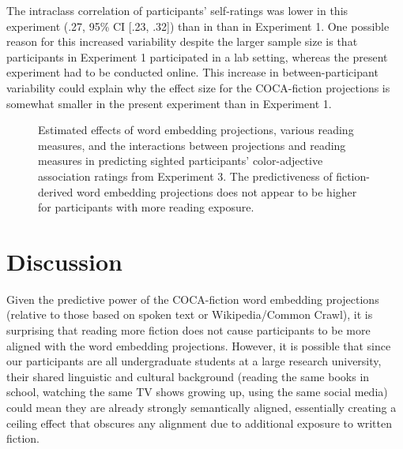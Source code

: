 \documentclass[10pt,letterpaper]{article}
\begin{document}
The intraclass correlation of participants' self-ratings was lower in this experiment (.27, 95\% CI [.23, .32]) than in than in Experiment 1. One possible reason for this increased variability despite the larger sample size is that participants in Experiment 1 participated in a lab setting, whereas the present experiment had to be conducted online. This increase in between-participant variability could explain why the effect size for the COCA-fiction projections is somewhat smaller in the present experiment than in Experiment 1.

\begin{figure}[ht!]
\begin{center}
\caption{Estimated effects of word embedding projections, various reading measures, and the interactions between projections and reading measures in predicting sighted participants' color-adjective association ratings from Experiment 3. The predictiveness of fiction-derived word embedding projections does not appear to be higher for participants with more reading exposure.}
\label{reading_measures}
\end{center}
\end{figure}

\section{Discussion}
Given the predictive power of the COCA-fiction word embedding projections (relative to those based on spoken text or Wikipedia/Common Crawl), it is surprising that reading more fiction does not cause participants to be more aligned with the word embedding projections. However, it is possible that since our participants are all undergraduate students at a large research university, their shared linguistic and cultural background (reading the same books in school, watching the same TV shows growing up, using the same social media) could mean they are already strongly semantically aligned, essentially creating a ceiling effect that obscures any alignment due to additional exposure to written fiction.
\end{document}
